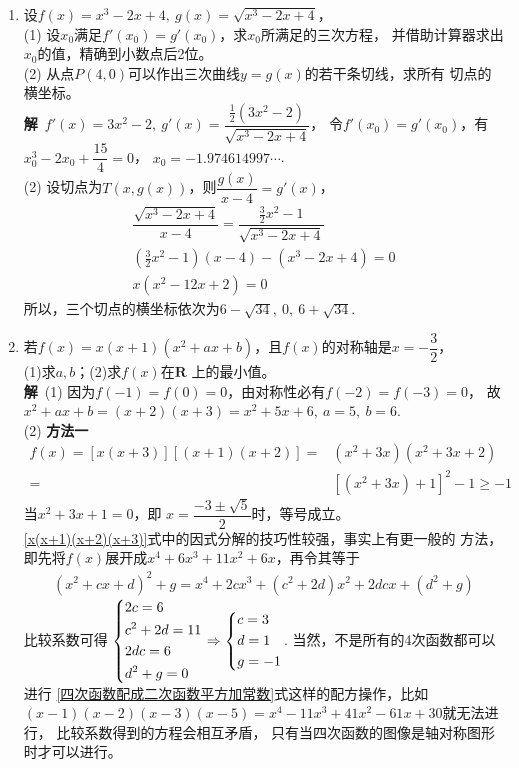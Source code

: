 \begin{enumerate}[label={【\textbf{例\thechapter.\arabic*}】},
 leftmargin=\inteval{\myenumleftmargin}pt,
 itemsep=\inteval{\myenumitempsep}pt,
 itemindent=\inteval{\myenumitemindent}pt]
\item  设$ f(x)=x^3-2x+4,\ g(x)=\sqrt{x^3-2x+4} $，\\
(1) 设$ x_0 $满足$ f'(x_0)=g'(x_0) $，求$ x_0 $所满足的三次方程，
并借助计算器求出$x_0$的值，精确到小数点后2位。\\
(2) 从点$ P(4,0) $可以作出三次曲线$ y=g(x) $的若干条切线，求所有
切点的横坐标。\\
\textbf{解}\ $ f'(x)=3x^2-2,\ g'(x)=
\dfrac{\frac{1}{2}(3x^2-2)}{\sqrt{x^3-2x+4}} $，
令$ f'(x_0)=g'(x_0) $，有$ x_0^3-2x_0+\dfrac{15}{4}=0 $，
$x_0=-1.974614997\cdots $. \\
(2) 设切点为$ T(x,g(x)) $，则$ \dfrac{g(x)}{x-4}=g'(x) $，
\begin{gather*}
    \dfrac{\sqrt{x^3-2x+4}}{x-4}=
    \dfrac{\frac{3}{2}x^2-1}{\sqrt{x^3-2x+4}} \\
    \left(\frac{3}{2}x^2-1\right)(x-4)-(x^3-2x+4)=0 \\
    x(x^2-12x + 2)=0
\end{gather*}
所以，三个切点的横坐标依次为$ 6-\sqrt{34},\ 0,\ 6+\sqrt{34}$.

\item \label{四次函数的轴对称性}
若$ f(x)=x(x+1)(x^2+ax+b) $，且$ f(x) $的对称轴是$ x=
-\dfrac{3}{2} $，\\ (1)求$ a,b $；\quad (2)求$ f(x) $在$ \textbf{R} $
上的最小值。\\
\textbf{解}\ (1) 因为$ f(-1)=f(0)=0 $，由对称性必有$ f(-2)=f(-3)=0 $，
故$ x^2+ax+b=(x+2)(x+3)=x^2+5x+6,\ a=5,\ b=6 $. \\
(2) \textbf{方法一}
\begin{align}\label{x(x+1)(x+2)(x+3)}
    f(x)=[x(x+3)][(x+1)(x+2)]=&(x^2+3x)(x^2+3x+2) \\
    =&[(x^2+3x)+1]^2-1 \geq -1 
\end{align}
当$ x^2+3x+1=0 $，即 $ x=\dfrac{-3\pm\sqrt{5}}{2} $时，等号成立。\\
\eqref{x(x+1)(x+2)(x+3)}式中的因式分解的技巧性较强，事实上有更一般的
方法，即先将$ f(x) $展开成$ x^4 + 6x^3 + 11x^2 + 6x $，再令其等于
\begin{gather}\label{四次函数配成二次函数平方加常数}
    (x^2+cx+d)^2+g=x^4+2cx^3+(c^2+2d)x^2+2dcx+(d^2+g) 
\end{gather}
比较系数可得
$ \begin{dcases}
    2c=6 \\
    c^2+2d=11 \\
    2dc=6 \\
    d^2+g=0
\end{dcases} \Rightarrow 
\begin{dcases}
    c=3 \\
    d=1\\
    g=-1
\end{dcases} $. 当然，不是所有的4次函数都可以进行
\eqref{四次函数配成二次函数平方加常数}式这样的配方操作，比如
$ (x-1)(x-2)(x-3)(x-5)=x^4-11x^3+41x^2-61x+30 $就无法进行，
比较系数得到的方程会相互矛盾，
只有当四次函数的图像是轴对称图形时才可以进行。


\end{enumerate}
